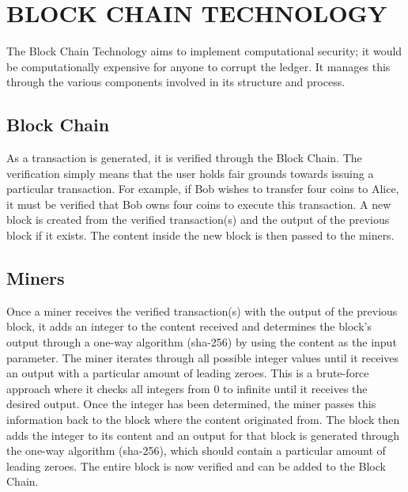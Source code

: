 \documentclass{article} %
\begin{document}
\noindent 
\section{BLOCK CHAIN TECHNOLOGY}

\begin{flushleft}
The Block Chain Technology aims to implement computational security; it would be computationally expensive for anyone to corrupt the ledger. It manages this through the various components involved in its structure and process. 
\end{flushleft}

\noindent 
\subsection{Block Chain}

\begin{flushleft}
As a transaction is generated, it is verified through the Block Chain. The verification simply means that the user holds fair grounds towards issuing a particular transaction. For example, if Bob wishes to transfer four coins to Alice, it must be verified that Bob owns four coins to execute this transaction. A new block is created from the verified transaction(s) and the output of the previous block if it exists. The content inside the new block is then passed to the miners.
\end{flushleft}

\noindent 
\subsection{Miners}

\begin{flushleft}
Once a miner receives the verified transaction(s) with the output of the previous block, it adds an integer to the content received and determines the block's output through a one-way algorithm (sha-256) by using the content as the input parameter. The miner iterates through all possible integer values until it receives an output with a particular amount of leading zeroes. This is a brute-force approach where it checks all integers from 0 to infinite until it receives the desired output. Once the integer has been determined, the miner passes this information back to the block where the content originated from. The block then adds the integer to its content and an output for that block is generated through the one-way algorithm (sha-256), which should contain a particular amount of leading zeroes. The entire block is now verified and can be added to the Block Chain.
\end{flushleft}
\end{document}
